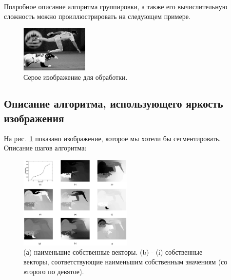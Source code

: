\documentclass[a4paper,10pt]{article}
\theoremstyle{plain}
\theoremstyle{definition}
\theoremstyle{remark}
\begin{document}
Полробное описание алгоритма группировки, а также его вычислительную сложность можно проиллюстрировать на следующем примере.

\begin{figure}
\centering
\includegraphics[width=0.3\textwidth]{fig_2.png}
\caption{\label{fig:baseball}Серое изображение для обработки.}
\end{figure}

\subsection{Описание алгоритма, использующего яркость изображения}

На рис.~\ref{fig:baseball} показано изображение, которое мы хотели бы сегментировать. Описание шагов алгоритма:

\begin{figure}
\centering
\includegraphics[width=0.5\textwidth]{fig_3.png}
\centering
\captionsetup{justification=centering}
\caption{\label{fig:eigenvectors}(а) наименьшие собственные векторы. (b) - (i) собственные векторы, соответствующие наименьшим собственным значениям (со второго по девятое).}
\end{figure}
\end{document}
